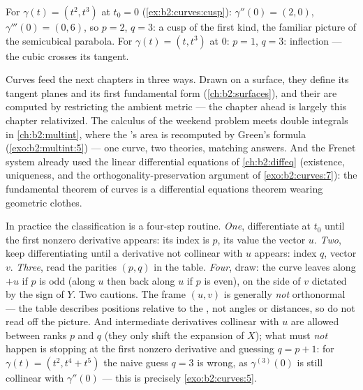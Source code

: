 \begin{example}
For $\gamma(t) = (t^2, t^3)$ at $t_0 = 0$
(\cref{ex:b2:curves:cusp}): $\gamma'' (0)= (2, 0)$, $\gamma'''(0) =
(0, 6)$, so $p = 2$, $q = 3$: a cusp of the first kind, the
familiar picture of the semicubical parabola. For $\gamma(t) = (t,
t^3)$ at $0$: $p = 1$, $q = 3$: inflection --- the cubic crosses
its tangent.
\end{example}

\begin{remark}
Curves feed the next chapters in three ways. Drawn on a
surface, they define its tangent planes and its first
fundamental form (\cref{ch:b2:surfaces}), and their 
are computed by restricting the ambient metric --- the
chapter ahead is largely this chapter relativized. The
 calculus of the weekend problem meets double
integrals in \cref{ch:b2:multint}, where the 's area
is recomputed by Green's formula
(\cref{exo:b2:multint:5}) --- one curve, two theories,
matching answers. And the Frenet system already used the
linear differential equations of \cref{ch:b2:diffeq}
(existence, uniqueness, and the orthogonality-preservation
argument of \cref{exo:b2:curves:7}): the fundamental theorem
of curves is a differential equations theorem wearing
geometric clothes.
\end{remark}

\begin{remark}
In practice the classification is a four-step routine.
\emph{One}, differentiate at $t_0$ until the first nonzero
derivative appears: its index is $p$, its value the vector
$u$. \emph{Two}, keep differentiating until a derivative
not collinear with $u$ appears: index $q$, vector $v$.
\emph{Three}, read the parities $(p, q)$ in the table.
\emph{Four}, draw: the curve leaves along $+u$ if $p$ is odd
(along $u$ then back along $u$ if $p$ is even), on the side
of $v$ dictated by the sign of $Y$. Two cautions. The frame
$(u, v)$ is generally \emph{not} orthonormal --- the table
describes positions relative to the , not angles
or distances, so do not read  off the picture.
And intermediate derivatives collinear with $u$ are allowed
between ranks $p$ and $q$ (they only shift the expansion of
$X$); what must \emph{not} happen is stopping at the first
nonzero derivative and guessing $q = p + 1$: for $\gamma(t)
= (t^2, t^4 + t^5)$ the naive guess $q = 3$ is wrong, as
$\gamma^{(3)}(0)$ is still collinear with $\gamma''(0)$ ---
this is precisely \cref{exo:b2:curves:5}.
\end{remark}

